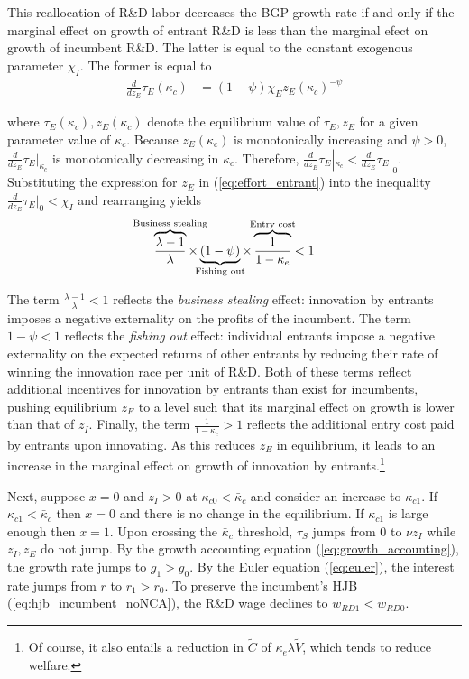 \documentclass[11pt,english]{article}
\theoremstyle{remark}
\begin{document}
This reallocation of R\&D labor decreases the BGP growth rate if and only if the marginal effect on growth of entrant R\&D is less than the marginal efect on growth of incumbent R\&D. The latter is equal to the constant exogenous parameter $\chi_I$. The former is equal to 
\begin{align}
\frac{d}{dz_E} \tau_E(\kappa_c) &= (1-\psi) \chi_E z_E (\kappa_c)^{-\psi} \label{eq:marginal_effect_effort_entrant}
\end{align}

where $\tau_E(\kappa_c), z_E(\kappa_c)$ denote the equilibrium value of $\tau_E, z_E$ for a given parameter value of $\kappa_c$. Because $z_E(\kappa_c)$ is monotonically increasing and $\psi > 0$, $\frac{d}{dz_E} \tau_E |_{\kappa_c}$ is monotonically decreasing in $\kappa_c$. Therefore, $\frac{d}{dz_E}\tau_E |_{\kappa_c} < \frac{d}{dz_E}\tau_E|_0$. Substituting the expression for $z_E$ in (\ref{eq:effort_entrant}) into the inequality $\frac{d}{dz_E}\tau_E |_{0}< \chi_I$ and rearranging yields 
\begin{align}
\overbrace{\frac{\lambda-1}{\lambda}}^{\mathclap{\text{Business stealing}}} \times \underbrace{(1-\psi)}_{\mathclap{\text{Fishing out}}} \times  \overbrace{\frac{1}{1-\kappa_{e}}}^{\mathclap{\text{Entry cost}}}< 1 \label{cs:growth_decreasing_condition}
\end{align}

The term $\frac{\lambda - 1}{\lambda} < 1$ reflects the \textit{business stealing} effect: innovation by entrants imposes a negative externality on the profits of the incumbent. The term $1-\psi < 1$ reflects the \textit{fishing out} effect: individual entrants impose a negative externality on the expected returns of other entrants by reducing their rate of winning the innovation race per unit of R\&D. Both of these terms reflect additional incentives for innovation by entrants than exist for incumbents, pushing equilibrium $z_E$ to a level such that its marginal effect on growth is lower than that of $z_I$. Finally, the term $\frac{1}{1-\kappa_e} > 1$ reflects the additional entry cost paid by entrants upon innovating. As this reduces $z_E$ in equilibrium, it leads to an increase in the marginal effect on growth of innovation by entrants.\footnote{Of course, it also entails a reduction in $\tilde{C}$ of $\kappa_e \lambda \tilde{V}$, which tends to reduce welfare.}

Next, suppose $x = 0$ and $z_I > 0$ at $\kappa_{c0} < \bar{\kappa}_c$ and consider an increase to $\kappa_{c1}$. If $\kappa_{c1} < \bar{\kappa}_c$ then $x = 0$ and there is no change in the equilibrium. If $\kappa_{c1}$ is large enough then $x = 1$. Upon crossing the $\bar{\kappa}_c$ threshold, $\tau_S$ jumps from $0$ to $\nu z_I$ while $z_I,z_E$ do not jump. By the growth accounting equation (\ref{eq:growth_accounting}), the growth rate jumps to $g_1 > g_0$. By the Euler equation (\ref{eq:euler}), the interest rate jumps from $r$ to $r_1>r_0$. To preserve the incumbent's HJB (\ref{eq:hjb_incumbent_noNCA}), the R\&D wage declines to $w_{RD1} < w_{RD0}$.
\end{document}
